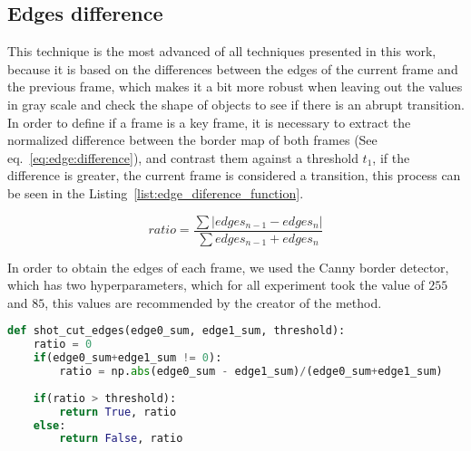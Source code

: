 \documentclass[journal]{IEEEtran}
\begin{document}
\subsection{Edges difference}

This technique is the most advanced of all techniques presented in this work, because it is based on the differences between the edges of the current frame and the previous frame, which makes it a bit more robust when leaving out the values in gray scale and check the shape of objects to see if there is an abrupt transition. In order to define if a frame is a key frame, it is necessary to extract the normalized difference between the border map of both frames (See eq.~\ref{eq:edge:difference}), and contrast them against a threshold $t_1$, if the difference is greater, the current frame is considered a transition, this process can be seen in the Listing~\ref{list:edge_diference_function}.

\begin{equation}\label{eq:edge:difference}
ratio = \frac{\sum | edges_{n-1} - edges_{n} |}{\sum edges_{n-1} + edges_{n}}
\end{equation}

In order to obtain the edges of each frame, we used the Canny border detector, which has two hyperparameters, which for all experiment took the value of $255$ and $85$, this values are recommended by the creator of the method.

\begin{lstlisting}[language=Python, caption=Function used to know if a frame is an abrupt transition, label=list:edge_diference_function]
def shot_cut_edges(edge0_sum, edge1_sum, threshold):
	ratio = 0
	if(edge0_sum+edge1_sum != 0):
		ratio = np.abs(edge0_sum - edge1_sum)/(edge0_sum+edge1_sum)
	
	if(ratio > threshold):
		return True, ratio
	else:
		return False, ratio
\end{lstlisting}
\end{document}
